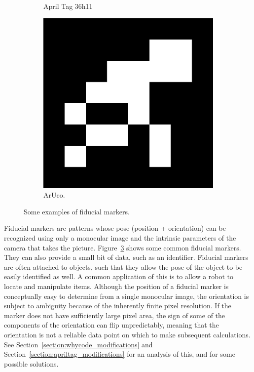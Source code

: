 \begin{figure}[]
\begin{subfigure}[b]{0.2\linewidth}
        \caption{April Tag 36h11}
        \label{figure:apriltag36h11}
    \end{subfigure}
    \begin{subfigure}[b]{0.2\linewidth}
        \includegraphics[width=\textwidth]{images/aruco_33}
        \caption{ArUco.}
        \label{figure:aruco33}
    \end{subfigure}
    \caption{Some examples of fiducial markers.}
    \label{figure:fiducial_markers}
\end{figure}

Fiducial markers are patterns whose pose (position + orientation) can be recognized
using only a monocular image and the intrinsic parameters of the camera that takes the picture.
Figure~\ref{figure:fiducial_markers} shows some common fiducial markers.
They can also provide a small bit of data, such as an identifier.
Fiducial markers are often attached to objects,
such that they allow the pose of the object to be easily identified as well.
A common application of this is to allow a robot to locate and manipulate items.
Although the position of a fiducial marker is conceptually easy to determine from
a single monocular image, the orientation is subject to ambiguity
because of the inherently finite pixel resolution.
If the marker does not have sufficiently large pixel area, the sign of some of the
components of the orientation can flip unpredictably, meaning that the orientation
is not a reliable data point on which to make subsequent calculations.
See Section~\ref{section:whycode_modifications} and Section~\ref{section:apriltag_modifications}
for an analysis of this, and for some possible solutions.